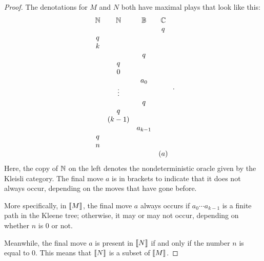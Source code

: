 \begin{proof}
  The denotations for $M$ and $N$ both have maximal plays that look like this:
  \[
    \begin{array}{cccc}
      \mathbb{N} & \mathbb{N} & \mathbb{B} & \mathbb{C} \\
          &     &     &  q  \\
       q  &     &     &     \\
       k  &     &     &     \\
          &     &  q  &     \\
          &  q  &     &     \\
          &  0  &     &     \\
          &     & a_0 &     \\
          &\vdots&    &     \\
          &     &  q  &     \\
          &  q  &     &     \\
          &(k-1)&     &     \\
          &     &a_{k-1}&   \\
       q  &     &     &     \\
       n  &     &     &     \\
          &     &     & (a)
    \end{array}\,.
    \]
  Here, the copy of $\mathbb{N}$ on the left denotes the nondeterministic oracle given by the Kleisli category.  
  The final move $a$ is in brackets to indicate that it does not always occur, depending on the moves that have gone before.

  More specifically, in $\left\llbracket M\right\rrbracket$, the final move $a$ always occurs if $a_0\cdots a_{k-1}$ is a finite path in the Kleene tree; otherwise, it may or may not occur, depending on whether $n$ is $0$ or not.

  Meanwhile, the final move $a$ is present in $\left\llbracket N\right\rrbracket$ if and only if the number $n$ is equal to $0$.
  This means that $\left\llbracket N\right\rrbracket$ is a subset of $\left\llbracket M\right\rrbracket$.


\end{proof}
